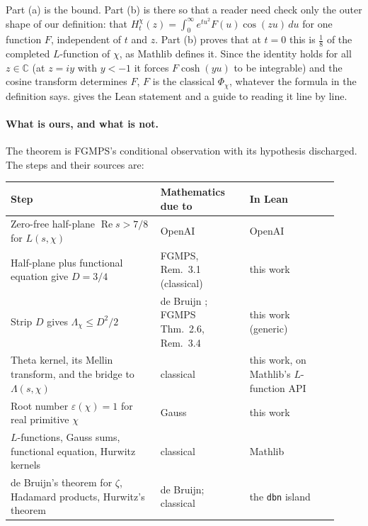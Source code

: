 \documentclass[11pt]{article}
\theoremstyle{definition}
\newcommand{\lean}[1]{\texttt{#1}}
\newcommand{\re}{\operatorname{Re}}
\newcommand{\C}{\mathbb{C}}
\newcommand{\Lc}{\Lambda}
\begin{document}
Part (a) is the bound. Part (b) is there so that a reader need check only the outer shape of our definition: that $H^\chi_t(z) = \int_0^\infty e^{tu^2}F(u)\cos(zu)\,du$ for one function $F$, independent of $t$ and $z$. Part (b) proves that at $t = 0$ this is $\tfrac18$ of the completed $L$-function of $\chi$, as Mathlib defines it. Since the identity holds for all $z \in \C$ (at $z = iy$ with $y < -1$ it forces $F\cosh(yu)$ to be integrable) and the cosine transform determines $F$, $F$ is the classical $\Phi_\chi$, whatever the formula in the definition says.  gives the Lean statement and a guide to reading it line by line.

\paragraph{What is ours, and what is not.} The theorem is FGMPS's conditional observation with its hypothesis discharged. The steps and their sources are:

\begin{center}\small
\begin{tabular}{@{}P{0.42\linewidth}P{0.25\linewidth}P{0.25\linewidth}@{}}
\toprule
Step & Mathematics due to & In Lean \\
\midrule
Zero-free half-plane $\re s > 7/8$ for $L(s,\chi)$ & OpenAI \cite{OAI7over8} & OpenAI \cite{OAIlean} \\
Half-plane plus functional equation give $D = 3/4$ & FGMPS, Rem.~3.1 \cite{FGMPS2026} (classical) & this work \\
Strip $D$ gives $\Lc_\chi \le D^2/2$ & de Bruijn \cite{deBruijn1950}; FGMPS Thm.~2.6, Rem.~3.4 & this work (generic) \\
Theta kernel, its Mellin transform, and the bridge to $\Lc(s,\chi)$ & classical & this work, on Mathlib's $L$-function API \\
Root number $\varepsilon(\chi) = 1$ for real primitive $\chi$ & Gauss \cite{Gauss1811} & this work \\
$L$-functions, Gauss sums, functional equation, Hurwitz kernels & classical & Mathlib \cite{Mathlib2020} \\
de Bruijn's theorem for $\zeta$, Hadamard products, Hurwitz's theorem & de Bruijn; classical & the \lean{dbn} island \cite{Murphy932} \\
\bottomrule
\end{tabular}
\end{center}
\end{document}
